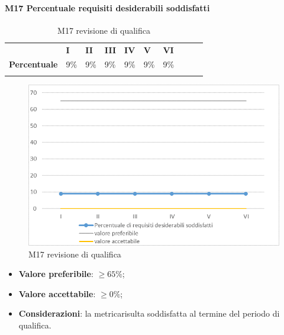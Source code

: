 \paragraph{M17 Percentuale requisiti desiderabili soddisfatti} \mbox{}
\begin{longtable}[H!] {						
		>{}p{50mm}  		
		>{}p{8mm}
		>{}p{8mm}		
		>{}p{8mm}		
		>{}p{8mm}		
		>{}p{8mm}		
		>{}p{8mm}
		>{}p{8mm}
		>{}p{8mm}
		>{}p{8mm}
	}
	\rowcolor{gray!50}
	\textbf{} & \textbf{I} & \textbf{II} & \textbf{III} & \textbf{IV} & \textbf{V} & \textbf{VI} \TBstrut \\ [2mm]
	\textbf{Percentuale} & 9\% & 9\% & 9\% & 9\% & 9\% & 9\% \TBstrut \\ [2mm]
	\rowcolor{white}
	\caption{M17 revisione di qualifica}
\end{longtable}
\begin{figure}[H] 	
	\includegraphics[width=\linewidth]{./img/grafici/RQ17.png}	
	\caption{M17 revisione di qualifica}	
\end{figure}
\begin{itemize}
	\item \textbf{Valore preferibile}: $\ge 65\%$;
	\item \textbf{Valore accettabile}: $\ge 0\%$;
	\item \textbf{Considerazioni}: la metrica\glosp risulta soddisfatta al termine del periodo di qualifica.
\end{itemize}


